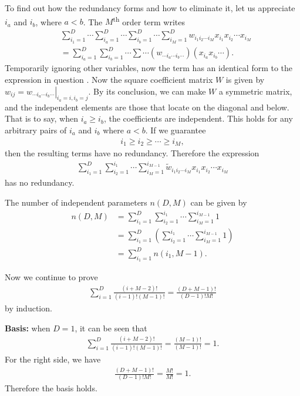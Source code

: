 \begin{answer}{}
	To find out how the redundancy forms and how to eliminate it, let us appreciate $i_a$ and $i_b$, where $a < b$. The $M$\textsuperscript{th} order term writes
	\begin{align}
		&\sum_{i_1 = 1}^{D} \cdots \sum_{i_a = 1}^{D} \cdots \sum_{i_b = 1}^{D} \cdots \sum_{i_M = 1}^{D} w_{i_1i_2\cdots i_M} x_{i_1}x_{i_2}\cdots x_{i_M}\\
		&= \sum_{i_a = 1}^{D}\sum_{i_b = 1}^{D} \cdots  \sum \cdots \left(w_{\cdots i_a \cdots i_b \cdots} \right)\left(x_{i_a}x_{i_b}\cdots\right).
	\end{align}
	Temporarily ignoring other variables, now the term has an identical form to the expression in question . Now the square coefficient matrix $W$ is given by $w_{ij} = \left.w_{\cdots i_a \cdots i_b \cdots}\right\rvert_{i_a = i, i_b = j}$. By its conclusion, we can make $W$ a symmetric matrix, and the independent elements are those that locate on the diagonal and below. That is to say, when $i_a \geq i_b$, the coefficients are independent. This holds for any arbitrary pairs of $i_a$ and $i_b$ where $a < b$.  If we guarantee
	\begin{align}
		i_1 \geq i_2 \geq \cdots \geq i_M,
	\end{align}
	then the resulting terms have no redundancy. Therefore the expression
	\begin{align}
		\sum_{i_1 = 1}^{D}\sum_{i_2=1}^{i_1}\cdots \sum_{i_M=1}^{i_{M-1}} \tilde{w}_{i_1i_2\cdots i_M} x_{i_1}x_{i_2}\cdots x_{i_M}
	\end{align}
	has no redundancy. 
	
	The number of independent parameters $n(D, M)$ can be given by
	\begin{align}
		n(D, M) &= 	\sum_{i_1 = 1}^{D}\sum_{i_2=1}^{i_1}\cdots \sum_{i_M=1}^{i_{M-1}} 1\\
		&=  \sum_{i_1 = 1}^{D} \left(\sum_{i_2=1}^{i_1} \cdots \sum_{i_M=1}^{i_{M-1}} 1\right)\\
		&= \sum_{i_1 = 1}^{D} n(i_1, M - 1).\label{1.15eqn2}
	\end{align}
	
	Now we continue to prove
	\begin{align}\label{1.15eqn1}
		\sum_{i = 1}^{D} \frac{(i + M - 2)!}{(i - 1)!(M - 1)!} = \frac{(D + M - 1)!}{(D-1)!M!}
	\end{align}
	by induction.
	
	\noindent\textbf{Basis:} when $D = 1$, it can be seen that
	\begin{align}
		\sum_{i = 1}^{D} \frac{(i + M - 2)!}{(i - 1)!(M - 1)!} = \frac{(M-1)!}{(M-1)!} = 1.
	\end{align} 
	For the right side, we have
	\begin{align}
		\frac{(D + M - 1)!}{(D-1)!M!} = \frac{M!}{M!} = 1.
	\end{align}
	Therefore the basis holds.
	

\end{answer}

